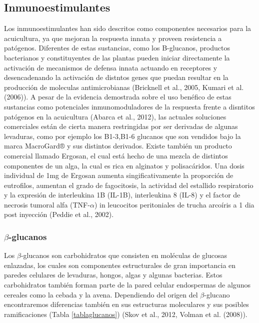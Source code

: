 \documentclass[11pt,a4paper,]{article}
\begin{document}
\pagebreak

\subsection{Inmunoestimulantes}\label{inmunoestimulantes}

Los inmunoestimulantes han sido descritos como componentes necesarios
para la acuicultura, ya que mejoran la respuesta innata y proveen
resistencia a patógenos. Diferentes de estas sustancias, como los
B-glucanos, productos bacterianos y constituyentes de las plantas pueden
iniciar directamente la activación de mecanismos de defensa innata
actuando en receptores y desencadenando la activación de distntos genes
que puedan resultar en la producción de moleculas antimicrobianas
(Bricknell et al., 2005, Kumari et al. (2006)). A pesar de la evidencia
demostrada sobre el uso benéfico de estas sustancias como potenciales
inmunomoduladores de la respuesta frente a disntitos patógenos en la
acuicultura (Abarca et al., 2012), las actuales soluciones comerciales
están de cierta manera restringidas por ser derivadas de algunas
levaduras, como por ejemplo los B1-3,B1-6 glucanos que son vendidos bajo
la marca MacroGard® y sus distintos derivados. Existe también un
producto comercial llamado Ergosan, el cual está hecho de una mezcla de
distintos componentes de un alga, la cual es rica en alginatos y
polisacáridos. Una dosis individual de 1mg de Ergosan aumenta
singificativamente la proporción de eutrofilos, aumentan el grado de
fagocitosis, la actividad del estallido respiratorio y la expresión de
interleukina 1B (IL-1B), interleukina 8 (IL-8) y el factor de necrosis
tumoral alfa (TNF-$\alpha$) in leucocitos peritoniales de trucha
arcoíris a 1 dia post inyección (Peddie et al., 2002).

\subsubsection{$\beta$-glucanos}\label{beta-glucanos}

Los $\beta$-glucanos son carbohidratos que consisten en moléculas de
glucosas enlazadas, los cuales son componentes estructurales de gran
importancia en paredes celulares de levaduras, hongos, algas y algunas
bacterias. Estos carbohidratos también forman parte de la pared celular
endospermas de algunos cereales como la cebada y la avena. Dependiendo
del origen del $\beta$-glucano encontraremos diferencias también en sus
estructuras moleculares y sus posibles ramificaciones (Tabla
\ref{tablaglucanos}) (Skov et al., 2012, Volman et al. (2008)).
\end{document}
